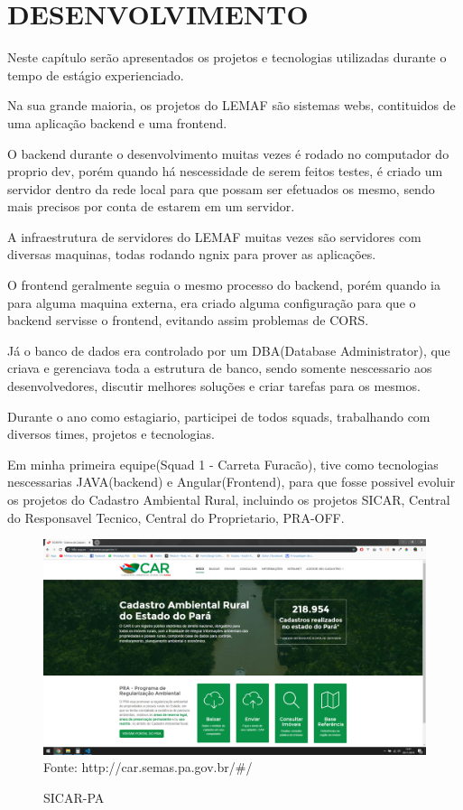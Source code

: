 \chapter{DESENVOLVIMENTO}
\label{cap:desenvolvimento}

Neste capítulo serão apresentados os projetos e tecnologias utilizadas durante o tempo de estágio experienciado.

Na sua grande maioria, os projetos do LEMAF são sistemas webs, contituidos de uma aplicação backend e uma frontend.

O backend durante o desenvolvimento muitas vezes é rodado no computador do proprio dev, porém quando há nescessidade de serem feitos testes, é criado um servidor dentro da rede local para que possam ser efetuados os mesmo, sendo mais precisos por conta de estarem em um servidor.

A infraestrutura de servidores do LEMAF muitas vezes são servidores com diversas maquinas, todas rodando ngnix para prover as aplicações.

O frontend geralmente seguia o mesmo processo do backend, porém quando ia para alguma maquina externa, era criado alguma configuração para que o backend servisse o frontend, evitando assim problemas de CORS.

Já o banco de dados era controlado por um DBA(Database Administrator), que criava e gerenciava toda a estrutura de banco, sendo somente nescessario aos desenvolvedores, discutir melhores soluções e criar tarefas para os mesmos.

Durante o ano como estagiario, participei de todos squads, trabalhando com diversos times, projetos e tecnologias.

Em minha primeira equipe(Squad 1 - Carreta Furacão), tive como tecnologias nescessarias JAVA(backend) e Angular(Frontend), para que fosse possivel evoluir os projetos do Cadastro Ambiental Rural, incluindo os projetos SICAR, Central do Responsavel Tecnico, Central do Proprietario, PRA-OFF.

\begin{figure}[H]
\centering
\caption{SICAR-PA} %
\includegraphics[scale=0.3]{SICAR}\\  %
{\small Fonte: http://car.semas.pa.gov.br/#/} %
\label{fig:exemplo} %
\end{figure}

